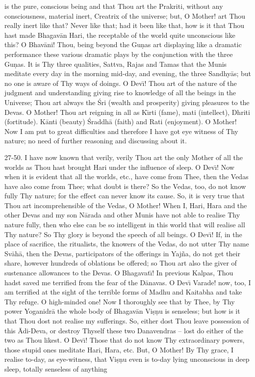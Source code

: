 is the pure, conscious being and that Thou art the Prakriti, without any consciousness, material inert, Creatrix of the universe; but, O Mother! art Thou really inert like that? Never like that; had it been like that, how is it that Thou hast made Bhagav\=an Hari, the receptable of the world quite unconscious like this? O Bhav\=ani! Thou, being beyond the Gu\d{n}as art displaying like a dramatic performance these various dramatic plays by the conjunction with the three Gu\d{n}as. It is Thy three qualities, Sattva, Rajas and Tamas that the Munis meditate every day in the morning mid-day, and evening, the three Sandhy\=as; but no one is aware of Thy ways of doings. O Dev\={\i}! Thou art of the nature of the judgment and understanding giving rise to knowledge of all the beings in the Universe; Thou art always the \'Sri (wealth and prosperity) giving pleasures to the Devas. O Mother! Thou art reigning in all as K\={\i}rti (fame), mati (intellect), Dhriti (fortitude). K\=anti (beauty) \'Sraddh\=a (faith) and Rati (enjoyment). O Mother! Now I am put to great difficulties and therefore I have got eye witness of Thy nature; no need of further reasoning and discussing about it.

27-50. I have now known that verily, verily Thou art the only Mother of all the worlds as Thou hast brought Hari under the influence of sleep. O Dev\={\i}! Now when it is evident that all the worlds, etc., have come from Thee, then the Vedas have also come from Thee; what doubt is there? So the Vedas, too, do not know fully Thy nature; for the effect can never know its cause. So, it is very true that Thou art incomprehensible of the Vedas, O Mother! When I, Hari, Hara and the other Devas and my son N\=arada and other Munis have not able to realise Thy nature fully, then who else can be so intelligent in this world that will realise all Thy nature? So Thy glory is beyond the speech of all beings. O Dev\={\i}! If, in the place of sacrifice, the ritualists, the knowers of the Vedas, do not utter Thy name Sv\=ah\=a, then the Devas, participators of the offerings in Yaj\~na, do not get their share, however hundreds of oblations be offered; so Thou art also the giver of sustenance allowances to the Devas. O Bhagavat\={\i}! In previous Kalpas, Thou hadst saved me terrified from the fear of the D\=anavas. O Dev\={\i} Varade! now, too, I am terrified at the sight of the terrible forms of Madhu and Kaitabha and take Thy refuge. O high-minded one! Now I thoroughly see that by Thee, by Thy power Yoganidr\=a the whole body of Bhagav\=an Vi\d{s}\d{n}u is senseless; but how is it that Thou dost not realise my sufferings. So, either dost Thou leave possession of this \=Adi-Deva, or destroy Thyself these two Danavendras -- lost do either of the two as Thou likest. O Dev\={\i}! Those that do not know Thy extraordinary powers, those stupid ones meditate Hari, Hara, etc. But, O Mother! By Thy grace, I realise to-day, as eye-witness, that Vi\d{s}\d{n}u even is to-day lying unconscious in deep sleep, totally senseless of anything

